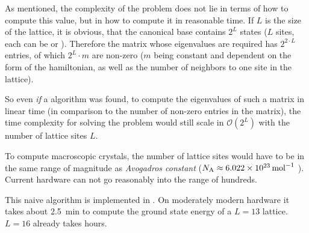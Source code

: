 As mentioned, the complexity of the problem does not lie in terms of how to compute this value, but in how to compute it in reasonable time.
If $L$ is the size of the lattice, it is obvious, that the canonical base contains $2^L$ states ($L$ sites, each can be \up or \down).
Therefore the matrix whose eigenvalues are required has $2^{2\cdot L}$ entries, of which $2^L \cdot m$ are non-zero ($m$ being constant and dependent on the form of the hamiltonian, as well as the number of neighbors to one site in the lattice). 

So even \emph{if} a algorithm was found, to compute the eigenvalues of such a matrix in linear time (in comparison to the number of non-zero entries in the matrix), the time complexity for solving the problem would still scale in $\mathcal{O} (2^L)$ with the number of lattice sites $L$.

To compute macroscopic crystals, the number of lattice sites would have to be in the same range of magnitude as \emph{Avogadros constant} ($N_\mathrm{A} \approx \SI{6.022E23}{\per\mol}$ \cite{avogadrosNumber}). Current hardware can not go reasonably into the range of hundreds. 

This naive algorithm is implemented in . On moderately modern hardware it takes about \SI{2.5}{\minute} to compute the ground state energy of a $L=13$ lattice. $L=16$ already takes hours.